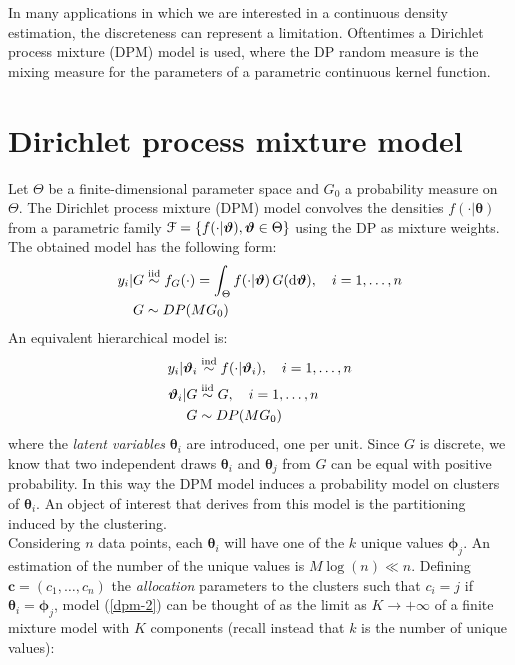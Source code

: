 In many applications in which we are interested in a continuous density estimation, the discreteness can represent a limitation.
Oftentimes a Dirichlet process mixture (DPM) model is used, where the DP random measure is the mixing measure for the parameters of a parametric continuous kernel function.

\section{Dirichlet process mixture model}
Let $\Theta$ be a finite-dimensional parameter space and $G_0$ a probability measure on $\Theta$.
The Dirichlet process mixture (DPM) model convolves the densities $f(\cdot|\boldsymbol\theta)$ from a parametric family $\mathcal F = \{f(\cdot|\boldsymbol{\vartheta}), \boldsymbol{\vartheta} \in \Theta \}$ using the DP as mixture weights.
The obtained model has the following form:
\begin{equation}
	\begin{aligned}\label{dpm-1}
	y_i | G &\stackrel{\text{iid}}{\sim} f_G(\cdot) = \int_\Theta f(\cdot|\boldsymbol{\vartheta}) \, G(\mathrm d\boldsymbol{\vartheta}), \quad i=1,\dots,n \\
	G &\sim DP(M G_0)
	\end{aligned}
\end{equation}
An equivalent hierarchical model is:
\begin{equation}
	\begin{aligned}\label{dpm-2}
	y_i | \boldsymbol{\vartheta}_i &\stackrel{\text{ind}}{\sim} f(\cdot|\boldsymbol{\vartheta}_i), \quad i=1,\dots,n \\
	\boldsymbol{\vartheta}_i | G &\stackrel{\text{iid}}{\sim} G, \quad i=1,\dots,n \\ 
	G &\sim DP(M G_0)
	\end{aligned}
\end{equation}
where the \emph{latent variables} $\boldsymbol\theta_i$ are introduced, one per unit.
Since $G$ is discrete, we know that two independent draws $\boldsymbol\theta_i$ and $\boldsymbol\theta_j$ from $G$ can be equal with positive probability.
In this way the DPM model induces a probability model on clusters of $\boldsymbol\theta_i$.
An object of interest that derives from this model is the partitioning induced by the clustering. \\%
Considering $n$ data points, each $\boldsymbol\theta_i$ will have one of the $k$ unique values $\boldsymbol\phi_{j}$.
An estimation of the number of the unique values is $M\log(n) \ll n$.
Defining  $\boldsymbol c= (c_1,\dots,c_n)$ the \emph{allocation} parameters to the clusters such that $c_i = j$ if $\boldsymbol\theta_i = \boldsymbol\phi_j$, model (\ref{dpm-2}) can be thought of as the limit as $K \to +\infty$  of a finite mixture model with $K$ components (recall instead that $k$ is the number of unique values):
